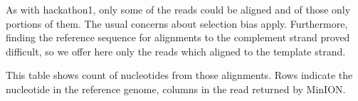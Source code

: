 As with hackathon1, only some of the reads could be aligned and of those only portions of them.  The usual concerns about selection bias apply.  Furthermore, finding the reference sequence for alignments to the complement strand proved difficult, so we offer here only the reads which aligned to the template strand.

This table shows count of nucleotides from those alignments.  Rows indicate the nucleotide in the reference genome, columns in the read returned by MinION.



